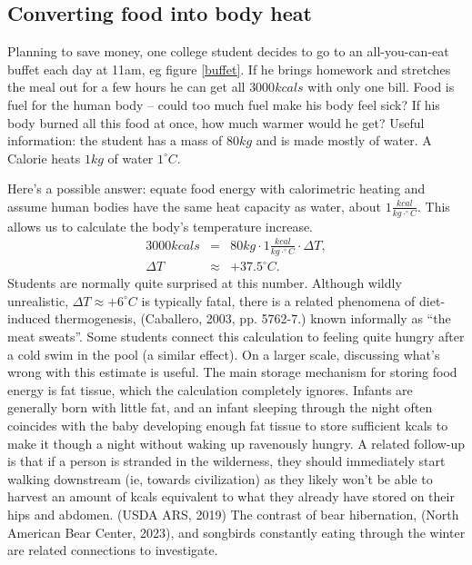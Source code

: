 \documentclass[man]{apa7}
\newcommand{\bea}{\begin{eqnarray}}
\newcommand{\eea}{\end{eqnarray}}
\newcommand{\degC}{^{\circ}C}
\begin{document}
\subsection{Converting food into body heat}
Planning to save money, one college student decides to go to an all-you-can-eat buffet each day at 11am, eg figure \ref{buffet}.  If he brings homework and stretches the meal out for a few hours he can get all $3000kcals$ with only one bill.  Food is fuel for the human body -- could too much fuel make his body feel sick? If his body burned all this food at once, how much warmer would he get? 
Useful information: the student has a mass of $80kg$ and is made mostly of water.  A Calorie heats $1 kg$ of water $1^{\circ}C$. 

Here's a possible answer:
equate food energy with calorimetric heating and assume human bodies have the same heat capacity as water, about $1\frac{kcal}{kg\cdot\degC}$. This allows us to calculate the body's temperature increase.
\bea
3000kcals &=& 80kg\cdot1 \frac{kcal}{kg\cdot \degC}\cdot\Delta T ,  \\
\Delta T &\approx& +37.5\degC . 
\eea
Students are normally quite surprised at this number.  Although wildly unrealistic, $\Delta T \approx +6\degC$ is typically fatal, there is a related phenomena of diet-induced thermogenesis,
(Caballero, 2003, pp. 5762-7.)
known informally as ``the meat sweats''. Some students connect this calculation to feeling quite hungry after a cold swim in the pool (a similar effect).  On a larger scale, discussing what's wrong with this estimate is useful.  The main storage mechanism for storing food energy is fat tissue, which the calculation completely ignores.  Infants are generally born with little fat, and an infant sleeping through the night often coincides with the baby developing enough fat tissue to store sufficient kcals to make it though a night without waking up ravenously hungry.  A related follow-up is that if a person is stranded in the wilderness, they should immediately start walking downstream (ie, towards civilization) as they likely won't be able to harvest an amount of kcals equivalent to what they already have stored on their hips and abdomen. (USDA ARS, 2019)  The contrast of bear hibernation, (North American Bear Center, 2023), and songbirds constantly eating through the winter are related connections to investigate.
\end{document}
